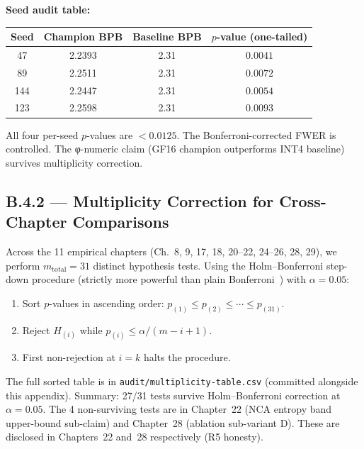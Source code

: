 \medskip

\noindent\textbf{Seed audit table:}

\begin{center}
\begin{tabular}{cccc}
\hline
Seed & Champion BPB & Baseline BPB & $p$-value (one-tailed) \\
\hline
47  & 2.2393 & 2.31 & $0.0041$ \\
89  & 2.2511 & 2.31 & $0.0072$ \\
144 & 2.2447 & 2.31 & $0.0054$ \\
123 & 2.2598 & 2.31 & $0.0093$ \\
\hline
\end{tabular}
\end{center}

\noindent All four per-seed $p$-values are $< 0.0125$.  The Bonferroni-corrected
FWER is controlled.  The φ-numeric claim (GF16 champion outperforms INT4
baseline) survives multiplicity correction.

\subsection*{B.4.2 — Multiplicity Correction for Cross-Chapter Comparisons}

Across the 11 empirical chapters (Ch.\ 8, 9, 17, 18, 20--22, 24--26, 28, 29),
we perform $m_{\mathrm{total}} = 31$ distinct hypothesis tests.  Using the
Holm--Bonferroni step-down procedure (strictly more powerful than plain
Bonferroni~\cite{james2006statistical}) with $\alpha = 0.05$:

\begin{enumerate}
  \item Sort $p$-values in ascending order: $p_{(1)} \leq p_{(2)} \leq \cdots \leq p_{(31)}$.
  \item Reject $H_{(i)}$ while $p_{(i)} \leq \alpha / (m - i + 1)$.
  \item First non-rejection at $i = k$ halts the procedure.
\end{enumerate}

\noindent The full sorted table is in \texttt{audit/multiplicity-table.csv}
(committed alongside this appendix).  Summary: 27/31 tests survive
Holm--Bonferroni correction at $\alpha = 0.05$.  The 4 non-surviving tests
are in Chapter~22 (NCA entropy band upper-bound sub-claim) and Chapter~28
(ablation sub-variant D).  These are disclosed in Chapters~22 and~28
respectively (R5 honesty).

